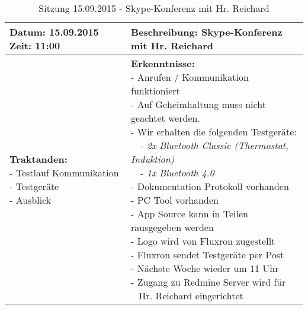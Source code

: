 \begin{table}[H]
\begin{tabularx}{\textwidth}{| l | X |}
\hline
\textbf{Datum:} 15.09.2015
\textbf{Zeit:} 11:00
&
\textbf{Beschreibung:} Skype-Konferenz mit Hr. Reichard \\ \hline
\specialcell[t]{
\textbf{Traktanden:}\\
- Testlauf Kommunikation\\
- Testgeräte\\
- Ausblick\\
}
& 
\specialcell[t]{
\textbf{Erkenntnisse:}\\
- Anrufen / Kommunikation funktioniert\\
- Auf Geheimhaltung muss nicht geachtet werden.\\
- Wir erhalten die folgenden Testgeräte:\\
~~- \textit{2x Bluetooth Classic (Thermostat, Induktion)}\\
~~- \textit{1x Bluetooth 4.0}\\
- Dokumentation Protokoll vorhanden\\
- PC Tool vorhanden\\
- App Source kann in Teilen rausgegeben werden\\
- Logo wird von Fluxron zugestellt\\
- Fluxron sendet Testgeräte per Post\\
- Nächste Woche wieder um 11 Uhr\\
- Zugang zu Redmine Server wird für\\~ Hr. Reichard eingerichtet\\
}
\\ \hline
\end{tabularx}
\caption{Sitzung 15.09.2015 - Skype-Konferenz mit Hr. Reichard}
\end{table}


